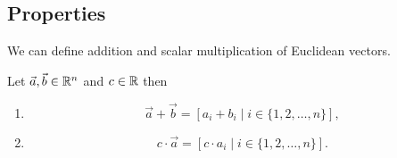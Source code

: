\subsection{Properties}

We can define addition and scalar multiplication of Euclidean vectors.

\begin{definition}
	Let $\vec{a},\vec{b} \in \mathbb{R}^n$ and $c \in \mathbb{R}$ then
	\begin{enumerate}
		\item
		\begin{equation*}
			\vec{a} + \vec{b} = \left[a_i + b_i \mid i \in \{1,2,\dots,n\}\right],
		\end{equation*}
		\item
		\begin{equation*}
			c \cdot \vec{a} = \left[c \cdot a_i \mid i \in \{1,2,\dots,n\}\right].
		\end{equation*}
	\end{enumerate}
\end{definition}

